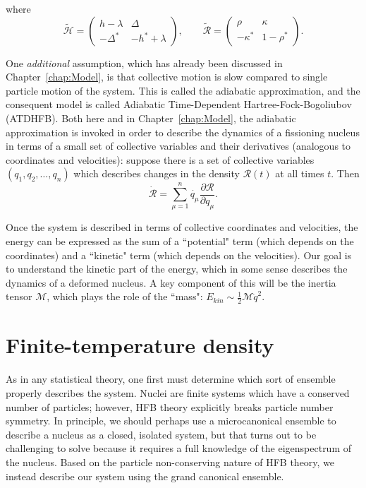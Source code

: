 \noindent where
\begin{equation}
\mathcal{\tilde{H}} = 
\left(\begin{array}{cc}
h-\lambda & \Delta \\
-\Delta^* & -h^*+\lambda
\end{array}\right), 
\qquad \mathcal{\tilde{R}} = 
\left(\begin{array}{cc}
\rho & \kappa \\
-\kappa^* & 1-\rho^*
\end{array}\right).
\end{equation}

One \textit{additional} assumption, which has already been discussed in Chapter~\ref{chap:Model}, is that collective motion is slow compared to single particle motion of the system. This is called the adiabatic approximation, and the consequent model is called Adiabatic Time-Dependent Hartree-Fock-Bogoliubov (ATDHFB). Both here and in Chapter~\ref{chap:Model}, the adiabatic approximation is invoked in order to describe the dynamics of a fissioning nucleus in terms of a small set of collective variables and their derivatives (analogous to coordinates and velocities): suppose there is a set of collective variables $(q_1,q_2,\dots,q_n)$ which describes changes in the density $\mathcal{R}(t)$ at all times $t$. Then
\begin{equation}\label{eqn:RdotQdot}
\mathcal{\dot{R}} = \sum_{\mu=1}^{n}\dot{q_\mu}\frac{\partial\mathcal{R}}{\partial q_\mu}.
\end{equation}

Once the system is described in terms of collective coordinates and velocities, the energy can be expressed as the sum of a ``potential" term (which depends on the coordinates) and a ``kinetic" term (which depends on the velocities). Our goal is to understand the kinetic part of the energy, which in some sense describes the dynamics of a deformed nucleus. A key component of this will be the inertia tensor $\mathcal{M}$, which plays the role of the ``mass": $E_{kin}\sim\frac{1}{2}\mathcal{M}\dot{q}^2$.

\section{Finite-temperature density}

As in any statistical theory, one first must determine which sort of ensemble properly describes the system. Nuclei are finite systems which have a conserved number of particles; however, HFB theory explicitly breaks particle number symmetry. In principle, we should perhaps use a microcanonical ensemble to describe a nucleus as a closed, isolated system, but that turns out to be challenging to solve because it requires a full knowledge of the eigenspectrum of the nucleus. Based on the particle non-conserving nature of HFB theory, we instead describe our system using the grand canonical ensemble.

